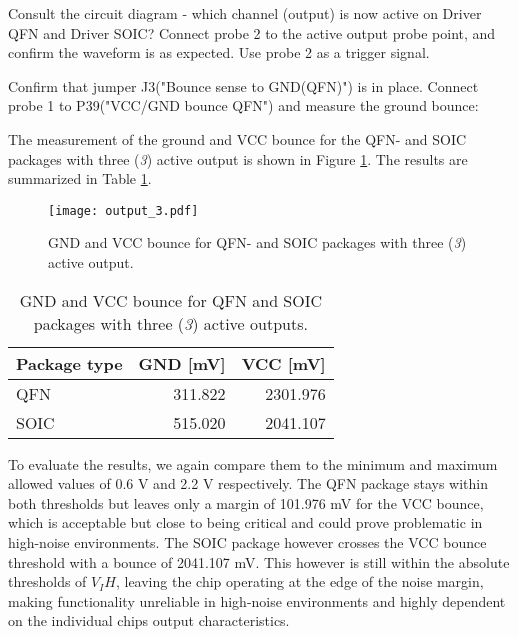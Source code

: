 \documentclass[../main.tex]{subfiles}
\begin{document}
\vspace{10pt}

Consult the circuit diagram - which channel (output) is now active on Driver QFN and Driver SOIC? Connect probe 2 to the active output probe point, and confirm the waveform is as expected. Use probe 2 as a trigger signal.

\vspace{10pt}

Confirm that jumper J3("Bounce sense to GND(QFN)") is in place. Connect probe 1 to P39("VCC/GND bounce QFN") and measure the ground bounce:

\solution

The measurement of the ground and VCC bounce for the QFN- and SOIC packages with three (\textit{3}) active output is shown in Figure \ref{fig:gnd_vcc_output_3}. The results are summarized in Table \ref{tab:output_3}.

\begin{figure}[H]
    \centering
    \texttt{[image: output\_3.pdf]}
    \caption{GND and VCC bounce for QFN- and SOIC packages with three (\textit{3}) active output.}
    \label{fig:gnd_vcc_output_3}
\end{figure}

\begin{table}[H]
    \centering
    \begin{tabular}{l | r r}
        \toprule[1pt]
        Package type    & GND [mV]  & VCC [mV]\\
        \midrule
        QFN             & 311.822   & 2301.976  \\
        SOIC            & 515.020   & 2041.107  \\
        \bottomrule[1pt]
    \end{tabular}
    \caption{GND and VCC bounce for QFN and SOIC packages with three (\textit{3}) active outputs.}
    \label{tab:output_3}
\end{table}

To evaluate the results, we again compare them to the minimum and maximum allowed values of 0.6 V and 2.2 V respectively. The QFN package stays within both thresholds but leaves only a margin of 101.976 mV for the VCC bounce, which is acceptable but close to being critical and could prove problematic in high-noise environments. The SOIC package however crosses the VCC bounce threshold with a bounce of 2041.107 mV. This however is still within the absolute thresholds of $V_IH$, leaving the chip operating at the edge of the noise margin, making functionality unreliable in high-noise environments and highly dependent on the individual chips output characteristics.
\end{document}
